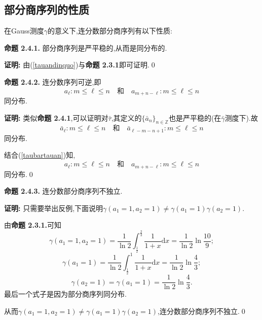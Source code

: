 \subsection{部分商序列的性质}
在Gauss测度$\gamma$的意义下,连分数部分商序列有以下性质:\par
\textbf{命题 2.4.1.  }\textsuperscript{\cite{Liu_Peng,Iosifescu}}
部分商序列是严平稳的,从而是同分布的.
\par
\textbf{证明:  }
由(\ref{tauandinquo})与\textbf{命题 2.3.1}即可证明.\qed
\par
\textbf{命题 2.4.2.  }\textsuperscript{\cite{Liu_Peng,Iosifescu}}
连分数序列可逆,即
$$a_\ell:m\leqslant\ell\leqslant n\quad \text{和}\quad a_{m+n-\ell}:m\leqslant\ell\leqslant n$$
同分布.
\par
\textbf{证明:  }
类似\textbf{命题 2.4.1},可以证明对$\bar\tau$,其定义的$\{\bar{a}_n\}_{n\in\mathbb{Z}}$也是严平稳的(在$\bar\gamma$测度下).故
$${\bar{a}}_\ell:m\leqslant \ell\leqslant n\quad \text{和}\quad {\bar{a}}_{\ell-m-n+1}:m\leqslant \ell\leqslant n$$
同分布.\par
结合(\ref{taubartauan})知,
$$a_\ell:m\leqslant\ell\leqslant n\quad \text{和}\quad a_{m+n-\ell}:m\leqslant\ell\leqslant n$$
同分布.\qed
\par
\textbf{命题 2.4.3.  }\textsuperscript{\cite{Liu_Peng}}
连分数部分商序列不独立.
\par
\textbf{证明:  }
只需要举出反例,下面说明$\gamma(a_1=1,a_2=1)\neq\gamma(a_1=1)\gamma(a_2=1)$.\par
由\textbf{命题 2.3.1.}可知
$$\gamma(a_1=1,a_2=1)=\frac{1}{\ln2}\int^{\frac{2}{3}}_\frac{1}{2}\frac{1}{1+x}\mathrm{d}x=\frac{1}{\ln2}\ln\frac{10}{9};$$
$$\gamma(a_1=1)=\frac{1}{\ln2}\int^1_\frac{1}{2}\frac{1}{1+x}\mathrm{d}x=\frac{1}{\ln2}\ln\frac{4}{3};$$
$$\gamma(a_2=1)=\gamma(a_1=1)=\frac{1}{\ln2}\ln\frac{4}{3}.$$
最后一个式子是因为部分商序列同分布.\par
从而$\gamma(a_1=1,a_2=1)\neq\gamma(a_1=1)\gamma(a_2=1)$,连分数部分商序列不独立.\qed


\sectionbreak